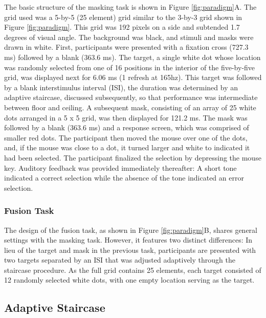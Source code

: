 \documentclass[
  ,man]{apa6}
\begin{document}
The basic structure of the masking task is shown in Figure \ref{fig:paradigm}A. The grid used was a 5-by-5 (25 element) grid similar to the 3-by-3 grid shown in Figure \ref{fig:paradigm}. This grid was 192 pixels on a side and subtended 1.7 degrees of visual angle. The background was black, and stimuli and masks were drawn in white. First, participants were presented with a fixation cross (727.3 ms) followed by a blank (363.6 ms). The target, a single white dot whose location was randomly selected from one of 16 positions in the interior of the five-by-five grid, was displayed next for 6.06 ms (1 refresh at 165hz). This target was followed by a blank interstimulus interval (ISI), the duration was determined by an adaptive staircase, discussed subsequently, so that performance was intermediate between floor and ceiling. A subsequent mask, consisting of an array of 25 white dots arranged in a 5 x 5 grid, was then displayed for 121.2 ms. The mask was followed by a blank (363.6 ms) and a response screen, which was comprised of smaller red dots. The participant then moved the mouse over one of the dots, and, if the mouse was close to a dot, it turned larger and white to indicated it had been selected. The participant finalized the selection by depressing the mouse key. Auditory feedback was provided immediately thereafter: A short tone indicated a correct selection while the absence of the tone indicated an error selection.

\hypertarget{fusion-task}{%
\subsubsection{Fusion Task}\label{fusion-task}}

The design of the fusion task, as shown in Figure \ref {fig:paradigm}B, shares general settings with the masking task. However, it features two distinct differences: In lieu of the target and mask in the previous task, participants are presented with two targets separated by an ISI that was adjusted adaptively through the staircase procedure. As the full grid contains 25 elements, each target consisted of 12 randomly selected white dots, with one empty location serving as the target.

\hypertarget{adaptive-staircase}{%
\subsection{Adaptive Staircase}\label{adaptive-staircase}}
\end{document}
